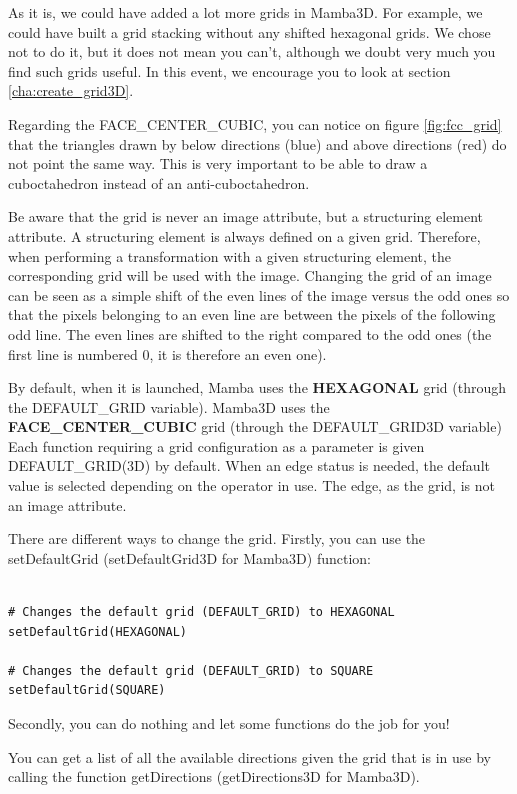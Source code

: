 \documentclass[a4paper,10pt,oneside]{article}
\begin{document}
As it is, we could have added a lot more grids in Mamba3D. For example,
we could have built a grid stacking without any shifted hexagonal grids.
We chose not to do it, but it does not mean you can't, although we doubt very
much you find such grids useful. In this event, we encourage you to look
at section \ref{cha:create_grid3D}.

Regarding the FACE\_CENTER\_CUBIC, you can notice on figure \ref{fig:fcc_grid}
that the triangles drawn by below directions (blue) and above directions (red)
do not point the same way. This is very important to be able to draw a 
cuboctahedron instead of an anti-cuboctahedron.

Be aware that the grid is never an image attribute, but a structuring element 
attribute. A structuring element is always defined on a given grid. Therefore, 
when performing a transformation with a given structuring element, the corresponding 
grid will be used with the image. Changing the grid of an image can be seen as a 
simple shift of the even lines of the image versus the odd ones so that the pixels 
belonging to an even line are between the pixels of the following odd line. The even 
lines are shifted to the right compared to the odd ones (the first line is numbered 0, 
it is therefore an even one).

By default, when it is launched, Mamba uses the \textbf{HEXAGONAL} grid (through 
the DEFAULT\_GRID variable). Mamba3D uses the \textbf{FACE\_CENTER\_CUBIC} grid
(through the DEFAULT\_GRID3D variable)  Each function requiring a grid
configuration as a parameter is given DEFAULT\_GRID(3D) by default. When an
edge status is needed, the default value is selected depending on the operator
in use. The edge, as the grid, is not an image attribute.

There are different ways to change the grid. Firstly, you can use the setDefaultGrid 
(setDefaultGrid3D for Mamba3D) function:

\lstset{language=Python}
\begin{lstlisting}

# Changes the default grid (DEFAULT_GRID) to HEXAGONAL
setDefaultGrid(HEXAGONAL)

# Changes the default grid (DEFAULT_GRID) to SQUARE
setDefaultGrid(SQUARE)
\end{lstlisting}

Secondly, you can do nothing and let some functions do the job for you!

You can get a list of all the available directions given the grid that is in use
by calling the function getDirections (getDirections3D for Mamba3D).
\end{document}
